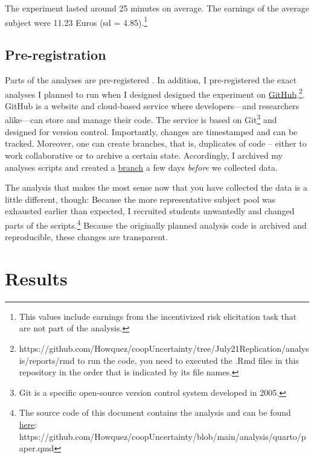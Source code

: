 \documentclass[
  authoryear,
  preprint,
  3p]{elsarticle}
\begin{document}
The experiment lasted around 25 minutes on average. The earnings of the
average subject were 11.23 Euros (sd = 4.85).\footnote{This values
  include earnings from the incentivized risk elicitation task that are
  not part of the analysis.}

\hypertarget{sec-registration}{%
\subsection{Pre-registration}\label{sec-registration}}

Parts of the analyses are pre-registered \citep{preregistration}. In
addition, I pre-registered the exact analyses I planned to run when I
designed designed the experiment on
\href{https://github.com/Howquez/coopUncertainty/blob/July21Replication/analysis/reports/rmd}{GitHub}.\footnote{https://github.com/Howquez/coopUncertainty/tree/July21Replication/analysis/reports/rmd
  to run the code, you need to executed the .Rmd files in this
  repository in the order that is indicated by its file names.}. GitHub
is a website and cloud-based service where developers---and researchers
alike---can store and manage their code. The service is based on
Git\footnote{Git is a specific open-source version control system
  developed in 2005.} and designed for version control. Importantly,
changes are timestamped and can be tracked. Moreover, one can create
branches, that is, duplicates of code -- either to work collaborative or
to archive a certain state. Accordingly, I archived my analyses scripts
and created a
\href{https://github.com/Howquez/coopUncertainty/tree/July21Replication}{branch}
a few days \emph{before} we collected data.

The analysis that makes the most sense now that you have collected the
data is a little different, though: Because the more representative
subject pool was exhausted earlier than expected, I recruited students
unwantedly and changed parts of the scripts.\footnote{The source code of
  this document contains the analysis and can be found
  \href{https://github.com/Howquez/coopUncertainty/blob/main/analysis/quarto/paper.qmd}{here}:
  https://github.com/Howquez/coopUncertainty/blob/main/analysis/quarto/paper.qmd}
Because the originally planned analysis code is archived and
reproducible, these changes are transparent.

\hypertarget{sec-results}{%
\section{Results}\label{sec-results}}
\end{document}
